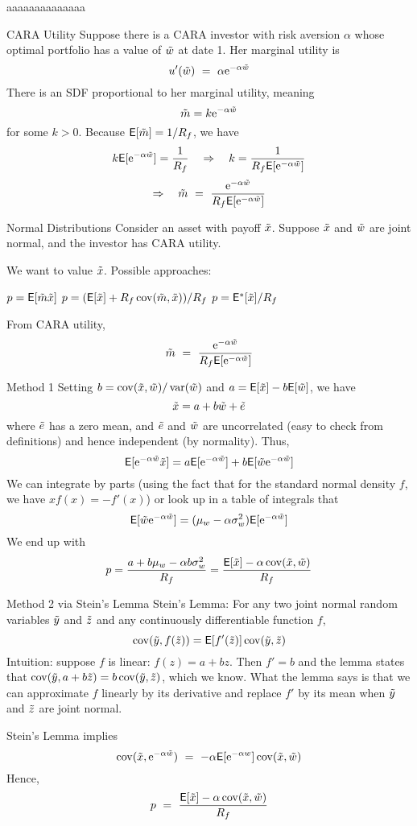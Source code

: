 aaaaaaaaaaaaaa\documentclass[xcolor=dvipsnames,10pt]{beamer}
\begin{document}
\begin{frame}{CARA Utility}
Suppose there is a CARA investor with risk aversion $\alpha$ whose optimal portfolio has a value of $\tilde{w}$ at date 1. 
Her marginal utility is
$$u'(\tilde{w}) \ = \ \alpha \mathrm{e}^{-\alpha \tilde{w}}$$
There is an SDF proportional to her marginal utility, \alert{meaning
$$\tilde{m}  =k \mathrm{e}^{-\alpha \tilde{w}}$$
for some $k>0$.  
Because $\mathsf{E}[\tilde{m}]=1/R_f$, we have
$$k \mathsf{E}[\mathrm{e}^{-\alpha \tilde{w}}] = \frac{1}{R_f} \quad \Rightarrow \quad k = \frac{1}{R_f \mathsf{E}[\mathrm{e}^{-\alpha \tilde{w}}]}$$ 
$$\Rightarrow \quad \tm \ = \ \frac{\E^{-\alpha \tw}}{R_f \mye[\E^{-\alpha \tw}]}$$}
\end{frame}

\begin{frame}{Normal Distributions}
Consider an asset with payoff $\tilde{x}$.  Suppose $\tilde{x}$ and $\tilde{w}$ are joint normal, and the investor has CARA utility.

We want to value $\tilde{x}$.  Possible approaches:
\begin{enumerate}
\im $p = \mathsf{E}[\tilde{m}\tilde{x}]$
\im $p = (\mathsf{E}[\tilde{x}] + R_f\operatorname{cov}(\tilde{m},\tilde{x}))/R_f$
\im $p = \mathsf{E}^*[\tilde{x}] / R_f$
\end{enumerate}
From CARA utility,
$$\tm \ = \ \frac{\E^{-\alpha \tw}}{R_f \mye[\E^{-\alpha \tw}]}$$
\end{frame}

\begin{frame}{Method 1}
    Setting \alert{$b=\operatorname{cov}(\tilde{x},\tilde{w})/\operatorname{var}(\tilde{w})$} and $a=\mathsf{E}[\tilde{x}]-b\mathsf{E}[\tilde{w}]$, we have
    $$\tilde{x} = a + b\tilde{w} + \tilde{e}$$
    where $\tilde{e}$ has a zero mean, and $\tilde{e}$ and $\tilde{w}$ are uncorrelated (easy to check from definitions) and hence independent (by normality).
    Thus,
    $$\mathsf{E}[\mathrm{e}^{-\alpha \tilde{w}}\tilde{x}] = a\mathsf{E}[\mathrm{e}^{-\alpha \tilde{w}}] + b\mathsf{E}[\tilde{w} \mathrm{e}^{-\alpha \tilde{w}}]$$
    We can integrate by parts (using the fact that for the standard normal density $f$, we have $xf(x) = - f'(x)$) or look up in a table of integrals that
    $$\mathsf{E}[\tilde{w} \mathrm{e}^{-\alpha \tilde{w}}] = (\mu_w-\alpha \sigma_w^2)\mathsf{E}[\mathrm{e}^{-\alpha \tilde{w}}]$$
    We end up with 
    $$p = \frac{a + b \mu_w - \alpha b \sigma_w^2}{R_f} = \frac{\mathsf{E}[\tilde{x}] - \alpha \operatorname{cov}(\tilde{x},\tilde{w})}{R_f}$$
    \end{frame}
\begin{frame}{Method 2 via Stein's Lemma}
Stein's Lemma: For any two joint normal random variables $\tilde{y}$ and $\tilde{z}$ and any continuously differentiable function $f$, 
$$\operatorname{cov}(\tilde{y}, f(\tilde{z})) = \mathsf{E}[f'(\tilde{z})]\operatorname{cov}(\tilde{y},\tilde{z})$$
Intuition: suppose $f$ is linear: $f(z) = a + bz$. Then $f'=b$ and the lemma states that $\operatorname{cov}(\tilde{y},a+b\tilde{z}) = b\operatorname{cov}(\tilde{y},\tilde{z})$, which we know.  What the lemma says is that we can approximate $f$ linearly by its derivative and replace $f'$ by its mean when $\tilde{y}$ and $\tilde{z}$ are joint normal.

Stein's Lemma implies
$$\operatorname{cov}(\tilde{x},\mathrm{e}^{-\alpha \tilde{w}}) \ = \ -\alpha \mathsf{E}[\mathrm{e}^{-\alpha w}]\operatorname{cov}(\tilde{x},\tilde{w})$$
Hence,
$$p \ = \ \frac{\mathsf{E}[\tilde{x}] - \alpha \operatorname{cov}(\tilde{x},\tilde{w})}{R_f}$$
\end{frame}
\end{document}
